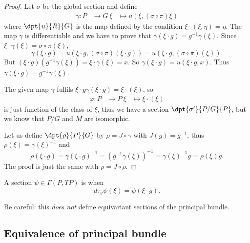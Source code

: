 \begin{proof}
\subdem{\ref{enuymaii}$\Rightarrow$ \ref{enuymaiii}}
Let $\sigma$ be the global section and define
		\begin{equation}
		\begin{aligned}
			\gamma \colon P &\to G\
			\xi&\mapsto u(\xi,(\sigma\circ\pi)\xi)
		\end{aligned}
	\end{equation}	
where $\dpt{u}{R}{G}$ is the map defined by the condition $\xi\cdot(\xi,\eta)=\eta$. The map $\gamma$ is differentiable and we have to prove that $\gamma(\xi\cdot g)=g^{-1}\gamma(\xi)$. Since $\xi\cdot \gamma(\xi)=\sigma\circ\pi(\xi)$,
\[
  \gamma(\xi\cdot g)=u(\xi\cdot g,(\sigma\circ\pi)(\xi\cdot g))=u(\xi\cdot g,(\sigma\circ\pi)(\xi)).
\]
But $(\xi\cdot g)(g^{-1}\gamma(\xi))=\xi\cdot\gamma(\xi)=x$. So $\gamma(\xi\cdot g)=u(\xi\cdot g,x)$. Thus $\gamma(\xi\cdot g)=g^{-1}\gamma(\xi)$.

\subdem{\ref{enuymaiii}$\Rightarrow$ \ref{enuymaii}}
The given map $\gamma$ fulfils $\xi\cdot g\gamma(\xi\cdot g)=\xi\cdot(\xi)$, so 
		\begin{equation}
		\begin{aligned}
			\varphi \colon P &\to P\
			\xi&\mapsto \xi\cdot(\xi)
		\end{aligned}
	\end{equation}	
is just function of the class of $\xi$, thus we have a section $\dpt{\sigma'}{P/G}{P}$, but we know that $P/G$ and $M$ are isomorphic.

\subdem{\ref{enuymaiii}$\Rightarrow$ \ref{enuymaiv}}
Let us define $\dpt{\rho}{P}{G}$ by $\rho=J\circ\gamma$ with $J(g)=g^{-1}$, thus $\rho(\xi)=\gamma(\xi)^{-1}$ and
\[
  \rho(\xi\cdot g)=\gamma(\xi\cdot g)^{-1}=(g^{-1}\gamma(\xi))^{-1}=\gamma(\xi)^{-1} g=\rho(\xi)g.
\]
\subdem{\ref{enuymaiv}$\Rightarrow$ \ref{enuymaiii}} The proof is just the same with $\rho=J\circ\rho$.
\end{proof}

\begin{definition}  
A section $\psi\in\Gamma(P,TP)$ is  when
\[ 
  d\tau_{g}\psi(\xi)=\psi(\xi\cdot g).
\]
\label{DefEqVectPrinc}
\end{definition}
Be careful: this \emph{does not} define equivariant sections of the principal bundle.
\subsection{Equivalence of principal bundle}

